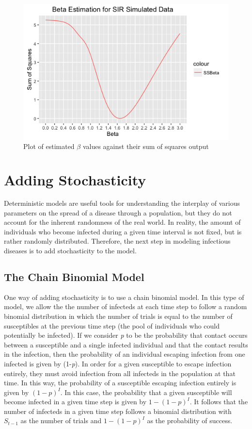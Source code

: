 \documentclass{article}
\begin{document}
\begin{figure}[h]
\includegraphics[scale=.5, outer]{BetaEstSIRnd.png}
\caption{Plot of estimated $\beta$ values against their sum of squares output}
\label{fig:SIRndEST}
\end{figure}

\section{Adding Stochasticity}
Deterministic models are useful tools for understanding the interplay of various parameters on the spread of a disease through a population, but they do not account for the inherent randomness of the real world. In reality, the amount of individuals who become infected during a given time interval is not fixed, but is rather randomly distributed. Therefore, the next step in modeling infectious diseases is to add stochasticity to the model. 

\subsection{The Chain Binomial Model}
One way of adding stochasticity is to use a chain binomial model. In this type of model, we allow the the number of infecteds at each time step to follow a random binomial distribution in which the number of trials is equal to the number of susceptibles at the previous time step (the pool of individuals who could potentially be infected). If we consider \textit{p} to be the probability that contact occurs between a susceptible and a single infected individual and that the contact results in the infection, then the probability of an individual escaping infection from one infected is given by (1-\textit{p}). In order for a given susceptible to escape infection entirely, they must avoid infection from all infecteds in the population at that time. In this way, the probability of a susceptible escaping infection entirely is given by $(1-p)^{I}$. In this case, the probability that a given susceptible will become infected in a given time step is given by $1-(1-p)^{I}$. It follows that the number of infecteds in a given time step follows a binomial distribution with $S_{t-1}$ as the number of trials and $1-(1-p)^{I}$ as the probability of success. 
\end{document}
